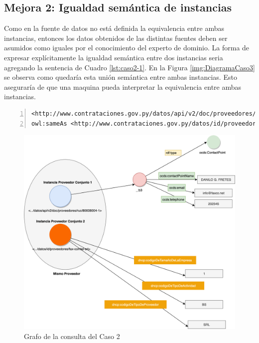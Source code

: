  \subsection{Mejora 2: Igualdad semántica de instancias}
 \label{section:caso2mejora2}
 Como en la fuente de datos no está definida la equivalencia entre ambas instancias, entonces los datos obtenidos de las distintas fuentes deben ser asumidos como iguales por el conocimiento del experto de dominio. La forma de expresar explícitamente la igualdad semántica entre dos instancias seria agregando la sentencia de Cuadro \ref{lst:caso2-1}. En la Figura \ref{img:DiagramaCaso3} se observa como quedaría esta unión semántica entre ambas instancias. Esto aseguraría de que una maquina pueda interpretar la equivalencia entre ambas instancias. 
 
 
\noindent\begin{minipage}[c]{\textwidth}
    \begin{lstlisting}[captionpos=b, caption=Declaración de igualdad semántica de dos instancias, label=lst:caso2-1,  numbers=left,  numberstyle=\tiny\color{mygray},frame=single]
<http://www.contrataciones.gov.py/datos/api/v2/doc/proveedores/ruc/80008004-1> 
owl:sameAs <http://www.contrataciones.gov.py/datos/id/proveedores/fax-comtel-srl>  .

     \end{lstlisting}
\end{minipage}
     \begin{figure}[ht!]
        \centering
        \includegraphics[width=150mm]{figuras/Diagramas-Caso2.png}
        \caption{Grafo de la consulta del Caso 2}
        \label{img:DiagramaCaso2}
     \end{figure}

